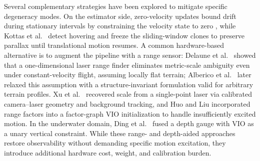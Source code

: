 \documentclass[journal]{IEEEtran}
\begin{document}
Several complementary strategies have been explored to mitigate specific degeneracy modes. On the estimator side, zero-velocity updates bound drift during stationary intervals by constraining the velocity state to zero \cite{skog2010zupt}, while Kottas et al.\ \cite{kottas2013detecting} detect hovering and freeze the sliding-window clones to preserve parallax until translational motion resumes. A common hardware-based alternative is to augment the pipeline with a range sensor: Delaune et al.\ \cite{delaune2021rangevio} showed that a one-dimensional laser range finder eliminates metric-scale ambiguity even under constant-velocity flight, assuming locally flat terrain; Alberico et al.\ \cite{alberico2024structure} later relaxed this assumption with a structure-invariant formulation valid for arbitrary terrain profiles. Xu et al.\ \cite{xu2023novel} recovered scale from a single-point laser via calibrated camera--laser geometry and background tracking, and Huo and Liu \cite{huo2023range} incorporated range factors into a factor-graph VIO initialization to handle insufficiently excited motion. In the underwater domain, Ding et al.\ \cite{ding2023rd} fused a depth gauge with VIO as a unary vertical constraint. While these range- and depth-aided approaches restore observability without demanding specific motion excitation, they introduce additional hardware cost, weight, and calibration burden. %
\end{document}

